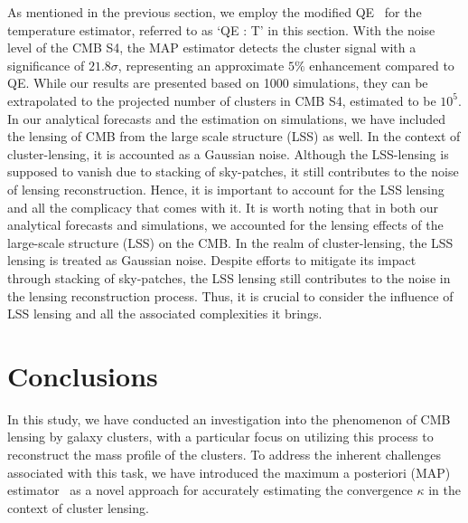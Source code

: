 \documentclass[prd, superscriptaddress, tightenlines, longbibliography, nofootinbib, eqsecnum, amsfonts, amsmath, floatfix, twocolumn, notitlepage]{revtex4-2}
\newcommand{\JC}[1]{\color{purple}{{JC:#1}}\color{black}\xspace}
\begin{document}
As mentioned in the previous section, we employ the modified QE~\cite{Hu:2007bt} for the temperature estimator, referred to as `QE : T' in this section. With the noise level of the CMB S4, the MAP estimator detects the cluster signal with a significance of $21.8\sigma$, representing an approximate $5\%$ \JC{?? how was this calculated ?}enhancement compared to QE. While our results are presented based on 1000 simulations, they can be extrapolated to the projected number of clusters in CMB S4, estimated to be $10^5$. In our analytical forecasts and the estimation on simulations, we have included the lensing of CMB from the large scale structure (LSS) as well. In the context of cluster-lensing, it is accounted as a Gaussian noise. Although the LSS-lensing is supposed to vanish due to stacking of sky-patches, it still contributes to the noise of lensing reconstruction. Hence, it is important to account for the LSS lensing and all the complicacy that comes with it. It is worth noting that in both our analytical forecasts and simulations, we accounted for the lensing effects of the large-scale structure (LSS) on the CMB. In the realm of cluster-lensing, the LSS lensing is treated as Gaussian noise. Despite efforts to mitigate its impact through stacking of sky-patches, the LSS lensing still contributes to the noise in the lensing reconstruction process. Thus, it is crucial to consider the influence of LSS lensing and all the associated complexities it brings.


\section{Conclusions}
\label{sec:conclusion}

In this study, we have conducted an investigation into the phenomenon of CMB lensing by galaxy clusters, with a particular focus on utilizing this process to reconstruct the mass profile of the clusters. To address the inherent challenges associated with this task, we have introduced the maximum a posteriori (MAP) estimator~\cite{Carron:2017mqf} as a novel approach for accurately estimating the convergence $\kappa$ in the context of cluster lensing.
\end{document}
